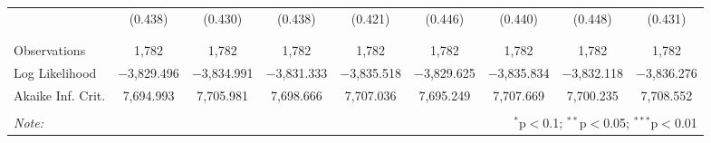 \begin{table}[!htbp]
\begin{tabular}{@{\extracolsep{5pt}}lcccccccc}
  & (0.438) & (0.430) & (0.438) & (0.421) & (0.446) & (0.440) & (0.448) & (0.431) \\ 
  & & & & & & & & \\ 
\hline \\[-1.8ex] 
Observations & 1,782 & 1,782 & 1,782 & 1,782 & 1,782 & 1,782 & 1,782 & 1,782 \\ 
Log Likelihood & $-$3,829.496 & $-$3,834.991 & $-$3,831.333 & $-$3,835.518 & $-$3,829.625 & $-$3,835.834 & $-$3,832.118 & $-$3,836.276 \\ 
Akaike Inf. Crit. & 7,694.993 & 7,705.981 & 7,698.666 & 7,707.036 & 7,695.249 & 7,707.669 & 7,700.235 & 7,708.552 \\ 
\hline 
\hline \\[-1.8ex] 
\textit{Note:}  & \multicolumn{8}{r}{$^{*}$p$<$0.1; $^{**}$p$<$0.05; $^{***}$p$<$0.01} \\ 
\end{tabular} 
\end{table} 
